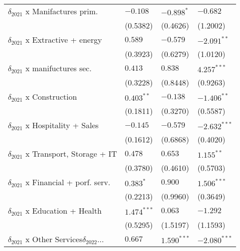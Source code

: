 \begin{tabular}{llll}
$\delta_{2021}$ x Manifactures prim.               &           $-0.108$ &         $-0.898^*$ &           $-0.682$ \\
                                                   &           (0.5382) &           (0.4626) &           (1.2002) \\
$\delta_{2021}$ x Extractive + energy              &            $0.589$ &           $-0.579$ &      $-2.091^{**}$ \\
                                                   &           (0.3923) &           (0.6279) &           (1.0120) \\
$\delta_{2021}$ x manifuctures sec.                &            $0.413$ &            $0.838$ &      $4.257^{***}$ \\
                                                   &           (0.3228) &           (0.8448) &           (0.9263) \\
$\delta_{2021}$ x Construction                     &       $0.403^{**}$ &           $-0.138$ &      $-1.406^{**}$ \\
                                                   &           (0.1811) &           (0.3270) &           (0.5587) \\
$\delta_{2021}$ x Hospitality + Sales              &           $-0.145$ &           $-0.579$ &     $-2.632^{***}$ \\
                                                   &           (0.1612) &           (0.6868) &           (0.4020) \\
$\delta_{2021}$ x Transport, Storage + IT          &            $0.478$ &            $0.653$ &       $1.155^{**}$ \\
                                                   &           (0.3780) &           (0.4610) &           (0.5703) \\
$\delta_{2021}$ x Financial + porf. serv.          &          $0.383^*$ &            $0.900$ &      $1.506^{***}$ \\
                                                   &           (0.2213) &           (0.9960) &           (0.3649) \\
$\delta_{2021}$ x Education + Health               &      $1.474^{***}$ &            $0.063$ &           $-1.292$ \\
                                                   &           (0.5295) &           (1.5197) &           (1.1593) \\
$\delta_{2021}$ x Other Services$\delta_{2022}$... &            $0.667$ &      $1.590^{***}$ &     $-2.080^{***}$ \\

\end{tabular}
